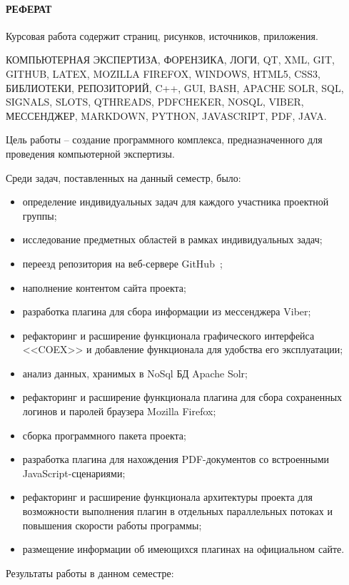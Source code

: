 \newpage
{}
\paragraph{\hfill РЕФЕРАТ \hfill}
Курсовая работа содержит  страниц,  рисунков,  источников,  приложения.

КОМПЬЮТЕРНАЯ ЭКСПЕРТИЗА, ФОРЕНЗИКА, ЛОГИ, QT, XML, GIT, GITHUB, LATEX, MOZILLA FIREFOX, WINDOWS, HTML5, CSS3, БИБЛИОТЕКИ, РЕПОЗИТОРИЙ, C++, GUI, BASH, APACHE SOLR, SQL, SIGNALS, SLOTS, QTHREADS, PDFCHEKER, NOSQL, VIBER, МЕССЕНДЖЕР, MARKDOWN, PYTHON, JAVASCRIPT, PDF, JAVA. 

Цель работы -- создание программного комплекса, предназначенного для проведения компьютерной экспертизы.

Среди задач, поставленных на данный семестр, было: 
\begin{itemize}
  \item определение индивидуальных задач для каждого участника проектной группы;
  \item исследование предметных областей в рамках индивидуальных задач; 
  \item переезд репозитория на веб-сервере GitHub~\cite{github};
  \item наполнение контентом сайта проекта;
  \item разработка плагина для сбора информации из мессенджера Viber;
  \item рефакторинг и расширение функционала графического интерфейса <<COEX>> и добавление функционала для удобства его эксплуатации;
  \item анализ данных, хранимых в NoSql БД Apache Solr;
  \item рефакторинг и расширение функционала плагина для сбора сохраненных логинов и паролей браузера Mozilla Firefox;
  \item сборка программного пакета проекта;  
  \item разработка плагина для нахождения PDF-документов со встроенными JavaScript-сценариями;
  \item рефакторинг и расширение функционала архитектуры проекта для возможности выполнения плагин в отдельных параллельных потоках и повышения скорости работы программы;
  \item размещение информации об имеющихся плагинах на официальном сайте.
\end{itemize}

Результаты работы в данном семестре:

